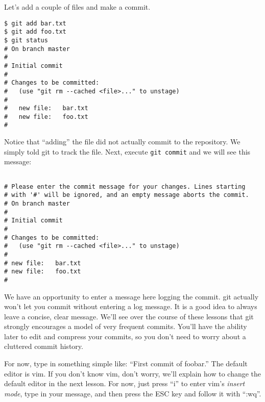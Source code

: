Let's add a couple of files and make a commit.
\begin{verbatim}
$ git add bar.txt 
$ git add foo.txt 
$ git status
# On branch master
#
# Initial commit
#
# Changes to be committed:
#   (use "git rm --cached <file>..." to unstage)
#
#	new file:   bar.txt
#	new file:   foo.txt
#
\end{verbatim}
Notice that ``adding'' the file did not actually commit to the repository. We simply told git to track the file. Next, execute \texttt{git commit} and we will see this message:
\begin{verbatim}

# Please enter the commit message for your changes. Lines starting
# with '#' will be ignored, and an empty message aborts the commit.
# On branch master
#
# Initial commit
#
# Changes to be committed:
#   (use "git rm --cached <file>..." to unstage)
#
# new file:   bar.txt
# new file:   foo.txt
#
\end{verbatim}
We have an opportunity to enter a message here logging the commit. git actually won't let you commit without entering a log message. It is a good idea to always leave a concise, clear message. We'll see over the course of these lessons that git strongly encourages a model of very frequent commits. You'll have the ability later to edit and compress your commits, so you don't need to worry about a cluttered commit history.

For now, type in something simple like: ``First commit of foobar.'' The default editor is vim. If you don't know vim, don't worry, we'll explain how to change the default editor in the next lesson. For now, just press ``i'' to enter vim's \emph{insert mode}, type in your message, and then press the ESC key and follow it with ``:wq''.